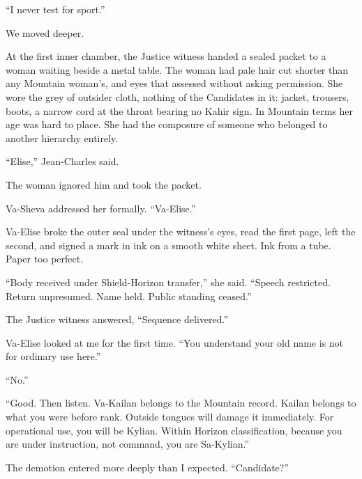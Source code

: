 ``I never test for sport.''\par

We moved deeper.\par

At the first inner chamber, the Justice witness handed a sealed packet to a woman waiting beside a metal table. The woman had pale hair cut shorter than any Mountain woman's, and eyes that assessed without asking permission. She wore the grey of outsider cloth, nothing of the Candidates in it: jacket, trousers, boots, a narrow cord at the throat bearing no Kahir sign. In Mountain terms her age was hard to place. She had the composure of someone who belonged to another hierarchy entirely.\par

``Elise,'' Jean-Charles said.\par

The woman ignored him and took the packet.\par

Va-Sheva addressed her formally. ``Va-Elise.''\par

Va-Elise broke the outer seal under the witness's eyes, read the first page, left the second, and signed a mark in ink on a smooth white sheet. Ink from a tube. Paper too perfect.\par

``Body received under Shield-Horizon transfer,'' she said. ``Speech restricted. Return unpresumed. Name held. Public standing ceased.''\par

The Justice witness answered, ``Sequence delivered.''\par

Va-Elise looked at me for the first time. ``You understand your old name is not for ordinary use here.''\par

``No.''\par

``Good. Then listen. Va-Kailan belongs to the Mountain record. Kailan belongs to what you were before rank. Outside tongues will damage it immediately. For operational use, you will be Kylian. Within Horizon classification, because you are under instruction, not command, you are Sa-Kylian.''\par

The demotion entered more deeply than I expected. ``Candidate?''\par

